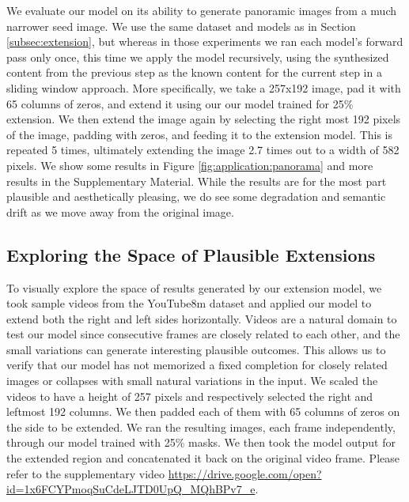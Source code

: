 We evaluate our model on its ability to generate panoramic images from a much narrower seed image. We use the same dataset and models as in Section \ref{subsec:extension}, but whereas in those experiments we ran each model's forward pass only once, this time we apply the model recursively, using the synthesized content from the previous step as the known content for the current step in a sliding window approach. More specifically, we take a 257x192 image, pad it with 65 columns of zeros, and extend it using our our model trained for 25\% extension. We then extend the image again by selecting the right most 192 pixels of the image, padding with zeros, and feeding it to the extension model. This is repeated 5 times, ultimately extending the image 2.7 times out to a width of 582 pixels. We show some results in Figure \ref{fig:application:panorama} and more results in the Supplementary Material. While the results are for the most part plausible and aesthetically pleasing, we do see some degradation and semantic drift as we move away from the original image. 

\subsection{Exploring the Space of Plausible Extensions}
\label{subsec:video}


To visually explore the space of results generated by our extension model, we took sample videos from the YouTube8m dataset \cite{abu2016youtube} and applied our model to extend both the right and left sides horizontally. Videos are a natural domain to test our model since consecutive frames are closely related to each other, and the small variations can generate interesting plausible outcomes. This allows us to verify that our model has not memorized a fixed completion for closely related images or collapses with small natural variations in the input. We scaled the videos to have a height of 257 pixels and respectively selected the right and leftmost 192 columns. We then padded each of them with 65 columns of zeros on the side to be extended. We ran the resulting images, each frame independently, through our model trained with 25\% masks. We then took the model output for the extended region and concatenated it back on the original video frame. Please refer to the supplementary video \url{https://drive.google.com/open?id=1x6FCYPmoqSuCdeLJTD0UpQ_MQhBPv7_e}. 



















